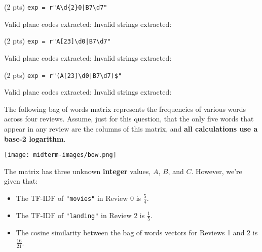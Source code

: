 \documentclass[twoside,12pt]{article}
\begin{document}
\begin{probset}
\begin{prob}[(10 pts)]
\begin{prob}[(8 pts)]
\begin{subprobset}
\begin{subprob}(2 pts) \verb!exp = r"A\d{2}0|B7\d7"!

Valid plane codes extracted:  \hspace{0.3in} Invalid strings extracted: 
    
    
\end{subprob}
\vspace{0.2in}

\begin{subprob}(2 pts) \verb!exp = r"A[23]\d0|B7\d7"!

Valid plane codes extracted:  \hspace{0.3in} Invalid strings extracted: 
    
\end{subprob}
\vspace{0.2in}

\begin{subprob}(2 pts) \verb!exp = r"(A[23]\d0|B7\d7)$"!

Valid plane codes extracted:  \hspace{0.3in} Invalid strings extracted: 
    
\end{subprob}
    
\end{subprobset}

\end{prob}

\newpage

\begin{prob}[(9 pts)]

The following bag of words matrix represents the frequencies of various words across four reviews. Assume, just for this question, that the only five words that appear in any review are the columns of this matrix, and \textbf{all calculations use a base-2 logarithm}.

\vspace{-0.2in}

\begin{center}
\texttt{[image: midterm-images/bow.png]}
\end{center}

\vspace{-0.2in}

The matrix has three unknown \textbf{integer} values, $A$, $B$, and $C$. However, we're given that:
\begin{itemize}
    \item The TF-IDF of \texttt{"movies"} in Review 0 is $\frac{5}{4}$.
    \item The TF-IDF of \texttt{"landing"} in Review 2 is $\frac{1}{5}$.
    \item The cosine similarity between the bag of words vectors for Reviews 1 and 2 is $\frac{16}{21}$.
\end{itemize}


\end{prob}
\end{prob}
\end{probset}
\end{document}
